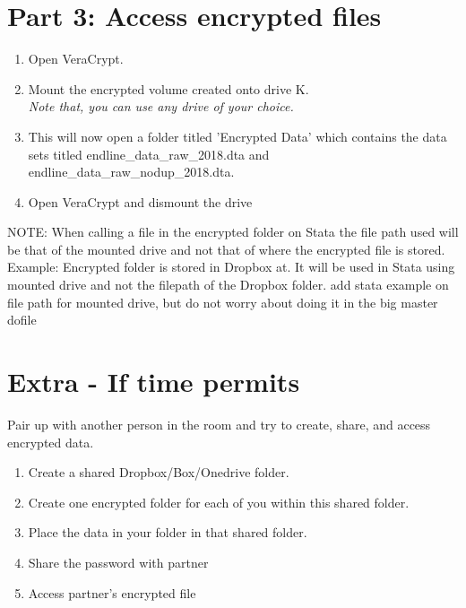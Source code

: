 \documentclass{tufte-handout}
\begin{document}
\section{Part 3: Access encrypted files}
\begin{enumerate}
	\item Open VeraCrypt.
	\item Mount the encrypted volume created onto drive K. \\
	\textit{Note that, you can use any drive of your choice.}
	\item This will now open a folder titled 'Encrypted Data' which contains the data sets titled endline\_data\_raw\_2018.dta and endline\_data\_raw\_nodup\_2018.dta.
	\item Open VeraCrypt and dismount the drive   
\end{enumerate}

NOTE: When calling a file in the encrypted folder on Stata the file path used will be that of the mounted drive and not that of where the encrypted file is stored. 
Example: Encrypted folder is stored in Dropbox at. It will be used in Stata using mounted drive and not the filepath of the Dropbox folder. add stata example on file path for mounted drive, but do not worry about doing it in the big master dofile
\section{Extra - If time permits}
Pair up with another person in the room and try to create, share, and access encrypted data.
\begin{enumerate}
	\item Create a shared Dropbox/Box/Onedrive folder.
	\item Create one encrypted folder for each of you within this shared folder.
	\item Place the data in your folder in that shared folder.
	\item Share the password with partner
	\item Access partner's encrypted file
\end{enumerate}
\end{document}
